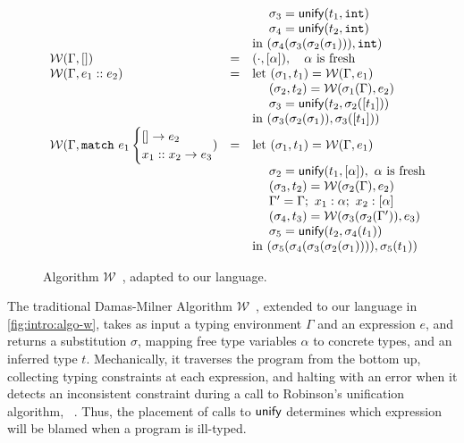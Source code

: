 \begin{figure}
\[{\begin{array}{lcl}
   &   & \quad\ \sigma_3 = \unify{t_1}{\tint} \\
   &   & \quad\ \sigma_4 = \unify{t_2}{\tint} \\
   &   & \text{in } (\sigma_4(\sigma_3(\sigma_2(\sigma_1))), \tint) \\
\W(\Gamma, \enil)
   & = & (\cdot, \tlist{\alpha}), \quad \alpha \text{ is fresh} \\
\W(\Gamma, \econs{e_1}{e_2})
   & = & \text{let } (\sigma_1, t_1) = \W(\Gamma, e_1) \\
   &   & \quad\ (\sigma_2, t_2) = \W(\sigma_1(\Gamma), e_2) \\
   &   & \quad\ \sigma_3 = \unify{t_2}{\sigma_2(\tlist{t_1})} \\
   &   & \text{in } (\sigma_3(\sigma_2(\sigma_1)), \sigma_3(\tlist{t_1})) \\
\W(\Gamma, \elcase{e_1}{e_2}{x_1}{x_2}{e_3})
   & = & \text{let } (\sigma_1, t_1) = \W(\Gamma, e_1) \\
   &   & \quad\ \sigma_2 = \unify{t_1}{\tlist{\alpha}},\ \alpha \text{ is fresh} \\
   &   & \quad\ (\sigma_3, t_2) = \W(\sigma_2(\Gamma), e_2) \\
   &   & \quad\ \Gamma' = \Gamma;\ x_1:\alpha;\ x_2:\tlist{\alpha} \\
   &   & \quad\ (\sigma_4, t_3) = \W(\sigma_3(\sigma_2(\Gamma')), e_3) \\
   &   & \quad\ \sigma_5 = \unify{t_2}{\sigma_4(t_1)} \\
   &   & \text{in } (\sigma_5(\sigma_4(\sigma_3(\sigma_2(\sigma_1)))), \sigma_5(t_1)) \\
\end{array}
}
\]
\caption{Algorithm $\mathcal{W}$~\citep{Damas1982-uw}, adapted to our language. }
\label{fig:intro:algo-w}
\end{figure}

The traditional Damas-Milner Algorithm
$\mathcal{W}$~\citep{Damas1982-uw}, extended to our language in
\autoref{fig:intro:algo-w}, takes as input a typing environment $\Gamma$
and an expression $e$, and returns a substitution $\sigma$, mapping free
type variables $\alpha$ to concrete types, and an inferred type $t$.
%
Mechanically, it traverses the program from the bottom up, collecting
typing constraints at each expression, and halting with an error when it
detects an inconsistent constraint during a call to
Robinson's unification algorithm, \unifysym~\citep{Robinson1965-rk}.
%
Thus, the placement of calls to $\mathsf{unify}$ determines which expression
will be blamed when a program is ill-typed.

